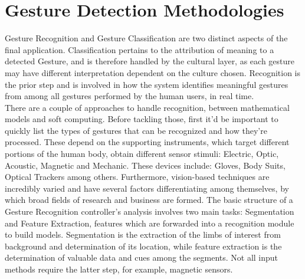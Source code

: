 \section{Gesture Detection Methodologies} \label{sec:ges_}
    Gesture Recognition and Gesture Classification are two distinct aspects of the final application. Classification pertains to the attribution of meaning to a detected Gesture, and is therefore handled by the cultural layer, as each gesture may have different interpretation dependent on the culture chosen. Recognition is the prior step and is involved in how the system identifies meaningful gestures from among all gestures performed by the human users, in real time.\\
    There are a couple of approaches to handle recognition, between mathematical models and soft computing. Before tackling those, first it’d be important to quickly list the types of gestures that can be recognized and how they’re processed. These depend on the supporting instruments, which target different portions of the human body, obtain different sensor stimuli: Electric, Optic, Acoustic, Magnetic and Mechanic. These devices include: Gloves, Body Suits, Optical Trackers among others. Furthermore, vision-based techniques are incredibly varied and have several factors differentiating among themselves, by which broad fields of research and business are formed. The basic structure of a Gesture Recognition controller’s analysis involves two main tasks: Segmentation and Feature Extraction, features which are forwarded into a recognition module to build models. Segmentation is the extraction of the limbs of interest from background and determination of its location, while feature extraction is the determination of valuable data and cues among the segments. Not all input methods require the latter step, for example, magnetic sensors.\\
